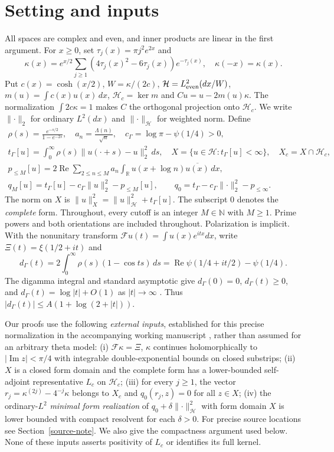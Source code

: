 \documentclass[11pt]{article}
\newcommand{\R}{\mathbb R}\newcommand{\C}{\mathbb C}\newcommand{\Hh}{\mathcal H}\newcommand{\Nn}{\mathcal N}\newcommand{\Kk}{\mathcal K}\newcommand{\norm}[1]{\lVert#1\rVert}\newcommand{\ip}[2]{\langle #1,#2\rangle}\newcommand{\dom}{\operatorname{Dom}}
\begin{document}
\section{Setting and inputs}\label{setting}
All spaces are complex and even, and inner products are linear in the first argument. For $x\ge0$, set $\tau_j(x)=\pi j^2 e^{2x}$ and
\[
\kappa(x)=e^{x/2}\sum_{j\ge1}(4\tau_j(x)^2-6\tau_j(x))e^{-\tau_j(x)},\quad \kappa(-x)=\kappa(x).
\]
Put $c(x)=\cosh(x/2)$, $W=\kappa/(2c)$, $\Hh=L^2_{\rm even}(dx/W)$, $m(u)=\int c(x)u(x)\,dx$, $\Hh_c=\ker m$ and $C u=u-2m(u)\kappa$. The normalization $\int 2c\kappa=1$ makes $C$ the orthogonal projection onto $\Hh_c$. We write $\norm{\cdot}_2$ for ordinary $L^2(dx)$ and $\norm{\cdot}_{\Hh}$ for weighted norm. Define
\begin{gather*}
 \rho(s)=\frac{e^{-s/2}}{1-e^{-2s}},\quad a_n=\frac{\Lambda(n)}{\sqrt n},\quad c_\Gamma=\log\pi-\psi(1/4)>0,\\
 t_\Gamma[u]=\int_0^\infty\rho(s)\norm{u(\cdot+s)-u}_2^2\,ds,\quad X=\{u\in\Hh:t_\Gamma[u]<\infty\},\quad X_c=X\cap\Hh_c,\\
 p_{\le M}[u]=2\operatorname{Re}\sum_{2\le n\le M}a_n\int_{\R}u(x+\log n)\overline{u(x)}\,dx,\\
 q_M[u]=t_\Gamma[u]-c_\Gamma\norm u_2^2-p_{\le M}[u],\qquad q_0=t_\Gamma-c_\Gamma\norm{\cdot}_2^2-p_{\le\infty}.
\end{gather*}
The norm on $X$ is $\norm u_X^2=\norm u_{\Hh}^2+t_\Gamma[u]$. The subscript $0$ denotes the \emph{complete} form. Throughout, every cutoff is an integer $M\in\mathbb N$ with $M\ge1$. Prime powers and both orientations are included throughout. Polarization is implicit. With the nonunitary transform $\mathcal F u(t)=\int u(x)e^{itx}dx$, write $\Xi(t)=\xi(1/2+it)$ and
\[
 d_\Gamma(t)=2\int_0^\infty\rho(s)(1-\cos ts)\,ds
 =\operatorname{Re}\psi(1/4+it/2)-\psi(1/4).
\]
The digamma integral and standard asymptotic give $d_\Gamma(0)=0$, $d_\Gamma(t)\ge0$, and $d_\Gamma(t)=\log|t|+O(1)$ as $|t|\to\infty$ \cite{dlmf}. Thus $|d_\Gamma(t)|\le A(1+\log(2+|t|))$.

Our proofs use the following \emph{external inputs}, established for this precise normalization in the accompanying working manuscript \cite{source}, rather than assumed for an arbitrary theta model: (i) $\mathcal F\kappa=\Xi$, $\kappa$ continues holomorphically to $|\operatorname{Im}z|<\pi/4$ with integrable double-exponential bounds on closed substrips; (ii) $X$ is a closed form domain and the complete form has a lower-bounded self-adjoint representative $L_c$ on $\Hh_c$; (iii) for every $j\ge1$, the vector $r_j=\kappa^{(2j)}-4^{-j}\kappa$ belongs to $X_c$ and $q_0(r_j,z)=0$ for all $z\in X$; (iv) the ordinary-$L^2$ \emph{minimal form realization} of $q_0+\delta\norm{\cdot}_{\Hh}^2$ with form domain $X$ is lower bounded with compact resolvent for each $\delta>0$. For precise source locations see Section~\ref{source-note}. We also give the compactness argument used below. None of these inputs asserts positivity of $L_c$ or identifies its full kernel.
\end{document}
